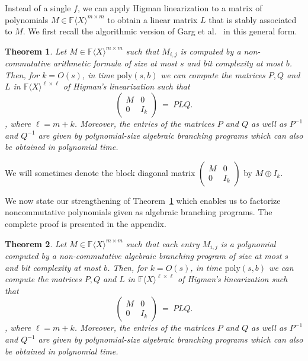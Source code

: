 \documentclass[10pt,a4paper]{article}
\newtheorem{theorem}{Theorem}[section]
\newcommand{\F}{\mathbb{F}}
\renewcommand{\angle}[1]{\langle #1 \rangle}
\newcommand{\FX}{\F\angle{X}}
\newcommand{\poly}{\mathrm{poly}}
\newcommand{\fR}{\FX}
\begin{document}
Instead of a single $f$, we can apply Higman linearization to a matrix
of polynomials $M\in\fR^{m\times m}$ to obtain a linear matrix $L$
that is stably associated to $M$.  We first recall the algorithmic
version of Garg et al.~\cite{GGOW20} in this general form.

\begin{theorem}\label{ehigman}{\rm\cite[Proposition A.2]{GGOW20}}
Let $M \in \fR^{m \times m}$ such that $M_{i,j}$ is computed by a
non-commutative arithmetic formula of size at most $s$ and bit
complexity at most $b$. Then, for $k=O(s)$, in time $\poly(s,b)$ we
can compute the matrices $P, Q$ and $L$ in $\fR^{\ell \times \ell }$
of Higman's linearization such that
\[
\left(
\begin{array}{c|c}
M & 0 \\
\hline
0 & I_{k}
\end{array}
\right) ~=~PLQ.
\], where $\ell= m+k$.
Moreover, the entries of the matrices $P$ and $Q$ as well as $P^{-1}$
and $Q^{-1}$ are given by polynomial-size algebraic branching programs
which can also be obtained in polynomial time.
\end{theorem}

We will sometimes denote the block diagonal matrix
$\left(
\begin{array}{c|c}
M & 0 \\
\hline
0 & I_{k}
\end{array}
\right)$ by $M\oplus I_k$.

We now state our strengthening of Theorem~\ref{ehigman} which enables
us to factorize noncommutative polynomials given as algebraic
branching programs. The complete proof is presented in the appendix.

\begin{theorem}\label{block-higman}
  Let $M \in \fR^{m \times m}$ such that each entry $M_{i,j}$ is a
  polynomial computed by a non-commutative algebraic branching program
  of size at most $s$ and bit complexity at most $b$. Then, for
  $k=O(s)$, in time $\poly(s,b)$ we can compute the matrices $P, Q$
  and $L$ in $\fR^{\ell \times \ell }$ of Higman's linearization such
  that
\[
\left(
\begin{array}{c|c}
M & 0 \\
\hline
0 & I_{k}
\end{array}
\right) ~=~PLQ.
\], where $\ell= m+k$.
Moreover, the entries of the matrices $P$ and $Q$ as well as $P^{-1}$
and $Q^{-1}$ are given by polynomial-size algebraic branching programs
which can also be obtained in polynomial time.
\end{theorem}
\end{document}
